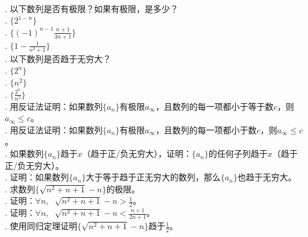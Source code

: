 \documentclass[12pt,UTF8,fontset=none]{ctexbook}
\begin{document}
\begin{xt}
    \mbox{} \\
    . 以下数列是否有极限？如果有极限，是多少？\\
    \indent{}. $\{2^{1-n}\}$ \\
    \indent{}. $\{(-1)^{n-1}\frac{n+1}{3n+1}\}$ \\
    \indent{}. $\{1 - \frac{1}{n^3+1}\}$ \\
    . 以下数列是否趋于无穷大？\\
    \indent{}. $\{2^{n}\}$ \\
    \indent{}. $\{n^2\}$ \\
    \indent{}. $\{\frac{2^n}{n^2}\}$\\
    . 用反证法证明：如果数列$\{a_n\}$有极限$a_\infty$，且数列的每一项都小于等于数$c$，则$a_\infty \leqslant c$。\\
    . 用反证法证明：如果数列$\{a_n\}$有极限$a_\infty$，且数列的每一项都小于数$c$，则$a_\infty \leqslant c$。\\
    . 如果数列$\{a_n\}$趋于$x$（趋于正/负无穷大），证明：$\{a_n\}$的任何子列趋于$x$（趋于正/负无穷大）。\\
    . 证明：如果数列$\{a_n\}$大于等于趋于正无穷大的数列，那么$\{a_n\}$也趋于无穷大。\\
    . 求数列$\{\sqrt{n^2 + n + 1} - n\}$的极限。\\
    . 证明：$\forall n,\;\,\, \sqrt{n^2 + n + 1} - n > \frac{1}{2}$。\\
    . 证明：$\forall n,\;\,\, \sqrt{n^2 + n + 1} - n < \frac{n + 1}{2n + 1}$。\\
    . 使用同归定理证明$\{\sqrt{n^2 + n + 1} - n\}$趋于$\frac{1}{2}$。
\end{xt}
\end{document}
